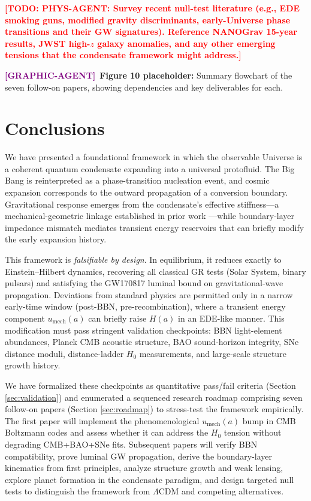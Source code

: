 \documentclass[11pt,a4paper]{article}
\newcommand{\umech}{u_{\mathrm{mech}}}
\theoremstyle{definition}
\newcommand{\TODO}[1]{\textcolor{red}{\textbf{[TODO: #1]}}}
\newcommand{\GRAPHAGENT}{\textcolor{purple}{\textbf{[GRAPHIC-AGENT]}}}
\begin{document}
\TODO{PHYS-AGENT: Survey recent null-test literature (e.g., EDE smoking guns, modified gravity discriminants, early-Universe phase transitions and their GW signatures). Reference NANOGrav 15-year results, JWST high-$z$ galaxy anomalies, and any other emerging tensions that the condensate framework might address.}

\GRAPHAGENT~\textbf{Figure 10 placeholder:} Summary flowchart of the seven follow-on papers, showing dependencies and key deliverables for each.

\section{Conclusions}
\label{sec:conclusions}

We have presented a foundational framework in which the observable Universe is a coherent quantum condensate expanding into a universal protofluid. The Big Bang is reinterpreted as a phase-transition nucleation event, and cosmic expansion corresponds to the outward propagation of a conversion boundary. Gravitational response emerges from the condensate's effective stiffness---a mechanical-geometric linkage established in prior work \cite{SkavbergMechG2025,SkavbergMechGR2025,SkavbergPlanckField2025}---while boundary-layer impedance mismatch mediates transient energy reservoirs that can briefly modify the early expansion history.

This framework is \emph{falsifiable by design}. In equilibrium, it reduces exactly to Einstein--Hilbert dynamics, recovering all classical GR tests (Solar System, binary pulsars) and satisfying the GW170817 luminal bound on gravitational-wave propagation. Deviations from standard physics are permitted only in a narrow early-time window (post-BBN, pre-recombination), where a transient energy component $\umech(a)$ can briefly raise $H(a)$ in an EDE-like manner. This modification must pass stringent validation checkpoints: BBN light-element abundances, Planck CMB acoustic structure, BAO sound-horizon integrity, SNe distance moduli, distance-ladder $H_0$ measurements, and large-scale structure growth history.

We have formalized these checkpoints as quantitative pass/fail criteria (Section \ref{sec:validation}) and enumerated a sequenced research roadmap comprising seven follow-on papers (Section \ref{sec:roadmap}) to stress-test the framework empirically. The first paper will implement the phenomenological $\umech(a)$ bump in CMB Boltzmann codes and assess whether it can address the $H_0$ tension without degrading CMB+BAO+SNe fits. Subsequent papers will verify BBN compatibility, prove luminal GW propagation, derive the boundary-layer kinematics from first principles, analyze structure growth and weak lensing, explore planet formation in the condensate paradigm, and design targeted null tests to distinguish the framework from $\Lambda$CDM and competing alternatives.
\end{document}

